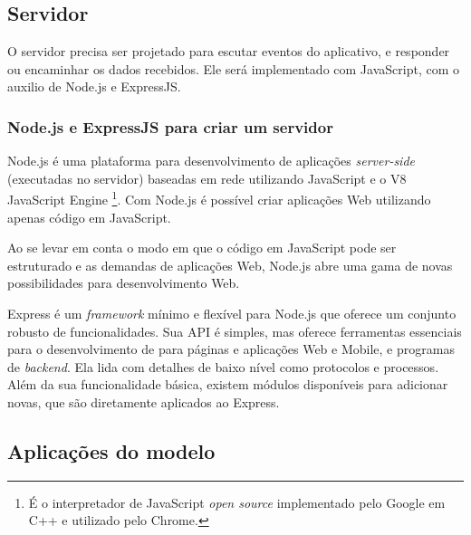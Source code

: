 \documentclass[a4paper,12pt]{article}
\begin{document}
\newpage
\subsection{Servidor}

O servidor precisa ser projetado para escutar eventos do aplicativo, e responder ou encaminhar os dados recebidos. Ele será implementado com JavaScript, com o auxilio de Node.js e ExpressJS.

\subsubsection{Node.js e ExpressJS para criar um servidor}

Node.js é uma plataforma para desenvolvimento de aplicações \emph{server-side} (executadas no servidor) baseadas em rede utilizando JavaScript e o V8 JavaScript Engine \footnote{É o interpretador de JavaScript \emph{open source} implementado pelo Google em C++ e utilizado pelo Chrome.}. Com Node.js é possível criar aplicações Web utilizando apenas código em JavaScript.

Ao se levar em conta o modo em que o código em JavaScript pode ser estruturado e as demandas de aplicações Web, Node.js abre uma gama de novas possibilidades para desenvolvimento Web.

Express é um \emph{framework} mínimo e flexível para Node.js que oferece um conjunto robusto de funcionalidades. Sua API é simples, mas oferece ferramentas essenciais para o desenvolvimento de para páginas e aplicações Web e Mobile, e programas de \emph{backend}. Ela lida com detalhes de baixo nível como protocolos e processos. Além da sua funcionalidade básica, existem módulos disponíveis para adicionar novas, que são diretamente aplicados ao Express.


\newpage
\subsection{Aplicações do modelo}
\end{document}

